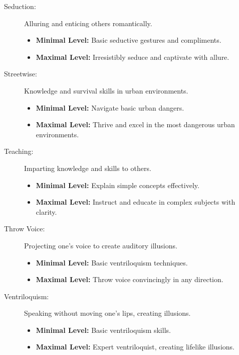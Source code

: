 \begin{description}
    \item[Seduction:] Alluring and enticing others romantically.
        \begin{itemize}
            \item \textbf{Minimal Level:} Basic seductive gestures and compliments.
            \item \textbf{Maximal Level:} Irresistibly seduce and captivate with allure.
        \end{itemize}

    \item[Streetwise:] Knowledge and survival skills in urban environments.
        \begin{itemize}
            \item \textbf{Minimal Level:} Navigate basic urban dangers.
            \item \textbf{Maximal Level:} Thrive and excel in the most dangerous urban environments.
        \end{itemize}

    \item[Teaching:] Imparting knowledge and skills to others.
        \begin{itemize}
            \item \textbf{Minimal Level:} Explain simple concepts effectively.
            \item \textbf{Maximal Level:} Instruct and educate in complex subjects with clarity.
        \end{itemize}

    \item[Throw Voice:] Projecting one's voice to create auditory illusions.
        \begin{itemize}
            \item \textbf{Minimal Level:} Basic ventriloquism techniques.
            \item \textbf{Maximal Level:} Throw voice convincingly in any direction.
        \end{itemize}

    \item[Ventriloquism:] Speaking without moving one's lips, creating illusions.
        \begin{itemize}
            \item \textbf{Minimal Level:} Basic ventriloquism skills.
            \item \textbf{Maximal Level:} Expert ventriloquist, creating lifelike illusions.
        \end{itemize}
\end{description}

